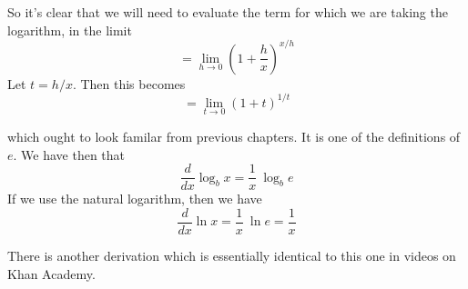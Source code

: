 \documentclass[11pt, oneside]{article}
\begin{document}
So it's clear that we will need to evaluate the term for which we are taking the logarithm, in the limit
\[ =  \lim_{h \rightarrow 0} (1 + \frac{h}{x})^{x/h} \]
Let $t = h/x$.  Then this becomes
\[ =  \lim_{t \rightarrow 0} (1 + t)^{1/t} \]

which ought to look familar from previous chapters.  It is one of the definitions of $e$.  We have then that
\[ \frac{d}{dx} \log_b x = \frac{1}{x} \ \log_b e \]
If we use the natural logarithm, then we have
\[ \frac{d}{dx} \ln x = \frac{1}{x} \ \ln e = \frac{1}{x} \]

There is another derivation which is essentially identical to this one in videos on Khan Academy.
\end{document}

